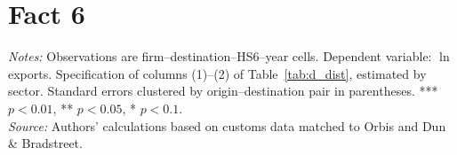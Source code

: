 \documentclass[11pt,a4paper]{article}
\begin{document}
\section*{Fact 6}%
\begin{table}[H]\centering\small%
  \caption{Distance and Firm Exports, by Sector}%
  \label{tab:a_f6sum}%
  \par\vspace{3pt}%
  \begin{minipage}{0.95\textwidth}\footnotesize %
  \textit{Notes:} Observations are firm--destination--HS6--year cells. Dependent variable: $\ln$ exports. Specification of columns (1)--(2) of Table~\ref{tab:d_dist}, estimated by sector. Standard errors clustered by origin--destination pair in parentheses. *** $p<0.01$, ** $p<0.05$, * $p<0.1$.\\[3pt]%
  \textit{Source:} Authors' calculations based on customs data matched to Orbis and Dun \& Bradstreet.%
  \end{minipage}%
  \end{table}
\end{document}

